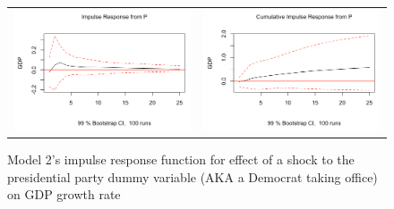 \documentclass[a4paper, 12pt]{article}
\begin{document}
\begin{figure}
    \centering
    \begin{tabular}{cc}
    \includegraphics[scale = .39]{model2/Screen Shot 2020-11-26 at 12.53.30 AM.png} & \includegraphics[scale = .39]{model2/Screen Shot 2020-11-26 at 12.53.41 AM.png} \\
    \end{tabular}
    \caption{Model 2's impulse response function for effect of a shock to the presidential party dummy variable (AKA a Democrat taking office) on GDP growth rate}
    \label{fig:my_label}
\end{figure}
\end{document}
